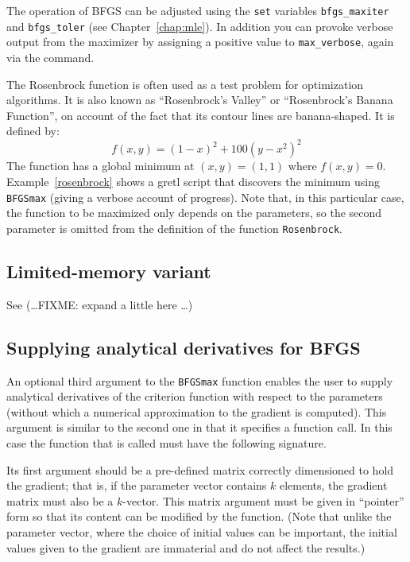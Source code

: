 The operation of BFGS can be adjusted using the \texttt{set} variables
\verb+bfgs_maxiter+ and \verb+bfgs_toler+ (see
Chapter~\ref{chap:mle}).  In addition you can provoke verbose output
from the maximizer by assigning a positive value to
\verb|max_verbose|, again via the  command.

The Rosenbrock function is often used as a test problem for
optimization algorithms. It is also known as ``Rosenbrock's Valley''
or ``Rosenbrock's Banana Function'', on account of the fact that its
contour lines are banana-shaped. It is defined by:
%
\[
    f(x,y) = (1 - x)^2 + 100(y - x^2)^2
\]
%
The function has a global minimum at $(x,y) = (1,1)$ where $f(x,y) =
0$.  Example~\ref{rosenbrock} shows a gretl script that
discovers the minimum using \texttt{BFGSmax} (giving a verbose account
of progress). Note that, in this particular case, the function to be
maximized only depends on the parameters, so the second parameter is
omitted from the definition of the function \texttt{Rosenbrock}. 

\subsection{Limited-memory variant}
\label{sec:LBFGS}

See \cite{byrd-etal95} (\ldots FIXME: expand a little here \ldots)

\subsection{Supplying analytical derivatives for BFGS}
\label{sec:BFGSgrad}

An optional third argument to the \texttt{BFGSmax} function enables
the user to supply analytical derivatives of the criterion
function with respect to the parameters (without which a numerical
approximation to the gradient is computed).  This argument is
similar to the second one in that it specifies a function call.
In this case the function that is called must have the following
signature.  

Its first argument should be a pre-defined matrix correctly
dimensioned to hold the gradient; that is, if the parameter vector
contains $k$ elements, the gradient matrix must also be a $k$-vector.
This matrix argument must be given in ``pointer'' form so that its
content can be modified by the function.  (Note that unlike the
parameter vector, where the choice of initial values can be important,
the initial values given to the gradient are immaterial and do not
affect the results.)

